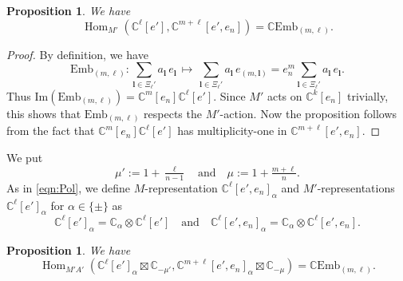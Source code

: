 \documentclass[reqno,11pt]{amsart}
\newtheorem{prop}[equation]{Proposition}
\theoremstyle{remark}
\theoremstyle{definition}
\numberwithin{equation}{section}
\newcommand{\ga}{\alpha}
\newcommand{\C}{\mathbb{C}}
\newcommand{\Hom}{\operatorname{Hom}}
\renewcommand{\Im}{\mathrm{Im}}
\newcommand{\Emb}{\mathrm{Emb}}
\begin{document}
\begin{prop}\label{prop:Emb1}
We have
\begin{equation*}
\Hom_{M'}(\C^\ell[e'], \C^{m+\ell}[e',e_n]) = \C \Emb_{(m,\ell)}.
\end{equation*}
\end{prop}

\begin{proof}
By definition, we have
\begin{equation*}
\Emb_{(m,\ell)}\colon 
\sum_{\mathbf{l}\in\Xi_{\ell}'}
a_{\mathbf{l}}\, e_{\mathbf{l}} 
\, \longmapsto \,
\sum_{\mathbf{l}\in\Xi_{\ell}'}
a_{\mathbf{l}}\, e_{(m,\mathbf{l})}
= e_n^m\sum_{\mathbf{l}\in\Xi_{\ell}'}
a_{\mathbf{l}}\, e_{\mathbf{l}}.
\end{equation*}
Thus $\Im(\Emb_{(m,\ell)}) = \C^m[e_n]\C^{\ell}[e']$.
Since $M'$ acts on $\C^k[e_n]$ trivially, this shows that $\Emb_{(m,\ell)}$ respects
the $M'$-action. Now the proposition follows from the fact that
$\C^m[e_n]\C^{\ell}[e']$ has multiplicity-one in $\C^{m+\ell}[e',e_n]$.
\end{proof}

We put
\begin{equation*}
\mu':=1+\tfrac{\ell}{n-1}
\quad 
\text{and}
\quad
\mu:=1+\tfrac{m+\ell}{n}.
\end{equation*}
As in \eqref{eqn:Pol},
we define 
$M$-representation $\C^\ell[e',e_n]_\ga$
and
$M'$-representations $\C^\ell[e']_\ga$ 
for $\ga \in \{\pm\}$
as
\begin{equation*}
\C^\ell[e']_\ga = \C_{\ga} \otimes \C^\ell[e']
\quad
\text{and}
\quad
\C^\ell[e',e_n]_\ga = \C_{\ga} \otimes \C^\ell[e',e_n].
\end{equation*}

\begin{prop}\label{prop:Emb2a}
We have
\begin{equation*}
\Hom_{M'A'}(\C^\ell[e']_\ga \boxtimes \C_{-\mu'},
\C^{m+\ell}[e',e_n]_\ga\boxtimes \C_{-\mu})
=\C \Emb_{(m,\ell)}.
\end{equation*}
\end{prop}
\end{document}
